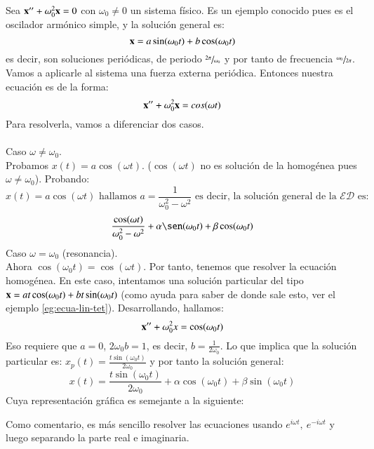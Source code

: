 \begin{eg}
    Sea $\mathbf{x}'' + \omega_0^2 \mathbf{x} = 0$  con $\omega_0 \neq 0$ un sistema físico. Es un ejemplo conocido pues es el oscilador armónico simple, y la solución general es:
    $$
        \mathbf{x} = a \sin(\omega_0 t) + b \cos(\omega_0 t)
    $$
    es decir, son soluciones periódicas, de periodo $\sfrac{2\pi}{\omega_0}$ y por tanto de frecuencia $\sfrac{\omega_0}{2\pi}$.
    Vamos a aplicarle al sistema una fuerza externa periódica. Entonces nuestra ecuación es de la forma:
    $$
        \mathbf{x}'' + \omega_0^2 \mathbf{x} = cos(\omega t)
    $$
    Para resolverla, vamos a diferenciar dos casos.\\\\
    Caso $\omega \neq \omega_0$.\\Probamos $x(t) = a\cos(\omega t)$. ($\cos(\omega t)$ no es solución de la homogénea pues $\omega \neq \omega_0$).
    Probando:
    $$
        x(t) = a\cos(\omega t) \text{ hallamos } a = \frac{1}{\omega_0^2 - \omega^2} \text{ es decir, la solución general de la } \mathcal{ED} \text{ es:}
    $$
    $$
        \frac{\cos(\omega t)}{\omega_0^2 - \omega^2} + \alpha \sen(\omega_0 t) + \beta\cos(\omega_0 t)
    $$
    Caso $\omega = \omega_0$ (resonancia).\\
    Ahora $\cos(\omega_0 t) = \cos(\omega t)$. Por tanto, tenemos que resolver la ecuación homogénea. En este caso, intentamos una solución particular del tipo $\mathbf{x} = a t \cos(\omega_0 t) + b t \sin(\omega_0 t)$ (como ayuda para saber de donde sale esto, ver el ejemplo \ref{eg:ecua-lin-tet}). Desarrollando, hallamos:
    $$
        \mathbf{x}'' + \omega_0^2 x = \cos(\omega_0 t)
    $$
    Eso requiere que $a = 0$, $2\omega_0 b = 1$, es decir, $b = \frac{1}{2 \omega_0}$. Lo que implica que la solución particular es: $x_p(t) = \frac{t \sin(\omega_0 t)}{2 \omega_0}$ y por tanto la solución general:
    $$
        x(t) = \frac{t \sin(\omega_0 t)}{2 \omega_0} + \alpha \cos(\omega_0 t) + \beta \sin(\omega_0 t)
    $$
    Cuya representación gráfica es semejante a la siguiente:
    \begin{center}
    \end{center}
\end{eg}
\begin{obs}
    Como comentario, es más sencillo resolver las ecuaciones usando $e^{i \omega t},\ e^{-i \omega t}$ y luego separando la parte real e imaginaria.
\end{obs}
